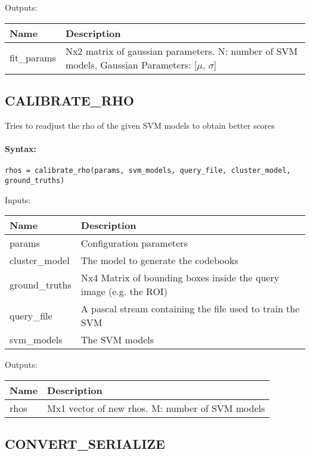 \bigskip
Outputs:

\begin{tabular}{|p{}|p{}|}
\hline
\textbf{Name} & \textbf{Description} \\
\hline \hline
fit\_params & Nx2 matrix of gaussian parameters. N: number of SVM models, Gaussian Parameters: [$\mu$, $\sigma$]  \\ \hline
\end{tabular}

\subsection{CALIBRATE\_RHO}

Tries to readjust the rho of the given SVM models to obtain better scores

\paragraph{Syntax:} \verb|rhos = calibrate_rho(params, svm_models, query_file, cluster_model, ground_truths)|

\bigskip
Inputs:

\begin{tabular}{|p{}|p{}|}
\hline
\textbf{Name} & \textbf{Description} \\
\hline \hline
params & Configuration parameters  \\ \hline
cluster\_model & The model to generate the codebooks  \\ \hline
ground\_truths & Nx4 Matrix of bounding boxes inside the query image (e.g. the ROI)  \\ \hline
query\_file & A pascal stream containing the file used to train the SVM  \\ \hline
svm\_models & The SVM models  \\ \hline
\end{tabular}

\bigskip
Outputs:

\begin{tabular}{|p{}|p{}|}
\hline
\textbf{Name} & \textbf{Description} \\
\hline \hline
rhos & Mx1 vector of new rhos. M: number of SVM models  \\ \hline
\end{tabular}

\subsection{CONVERT\_SERIALIZE}


